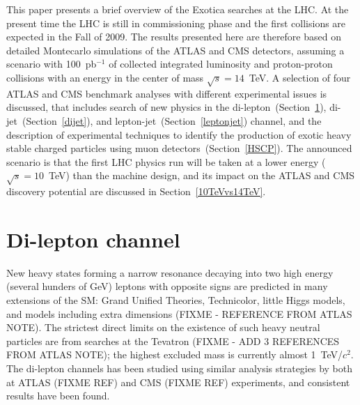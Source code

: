 \documentclass{cimento}
\begin{document}
This paper presents a brief overview of the Exotica searches at the LHC. 
At the present time the LHC is still in commissioning phase 
and the first collisions are expected in the Fall of 2009.
The results presented here are therefore based on detailed 
Montecarlo simulations of the ATLAS and CMS detectors, 
assuming a scenario with 100~pb$^{-1}$ of collected integrated luminosity 
and proton-proton collisions with an energy in the center of mass $\sqrt{s} = 14$~TeV. 
A selection of four ATLAS and CMS benchmark analyses with different 
experimental issues is discussed, that includes 
search of new physics in the di-lepton~(Section~\ref{dilepton}), 
di-jet~(Section~\ref{dijet}), and lepton-jet~(Section~\ref{leptonjet}) channel, 
and the description of experimental techniques to identify the production of 
exotic heavy stable charged particles using muon detectors~(Section~\ref{HSCP}).
The announced scenario is that the first LHC physics run 
will be taken at a lower energy ($\sqrt{s} = 10$~TeV) 
than the machine design, and its impact on the ATLAS and CMS 
discovery potential are discussed in Section~\ref{10TeVvs14TeV}. 


\section{Di-lepton channel} \label{dilepton}

New heavy states forming a narrow resonance decaying 
into two high energy (several hunders of GeV) 
leptons with opposite signs are predicted in  
many extensions of the SM: Grand Unified Theories, 
Technicolor, little Higgs models, and models 
including extra dimensions (FIXME - REFERENCE FROM ATLAS NOTE). 
The strictest direct limits on the existence of such 
heavy neutral particles are from searches 
at the Tevatron (FIXME - ADD 3 REFERENCES FROM ATLAS NOTE); 
the highest excluded mass is currently almost 1~TeV/$c^2$.
The di-lepton channels has been studied using similar 
analysis strategies by both at ATLAS (FIXME REF) and CMS (FIXME REF)
experiments, and consistent results have been found. 
\end{document}
